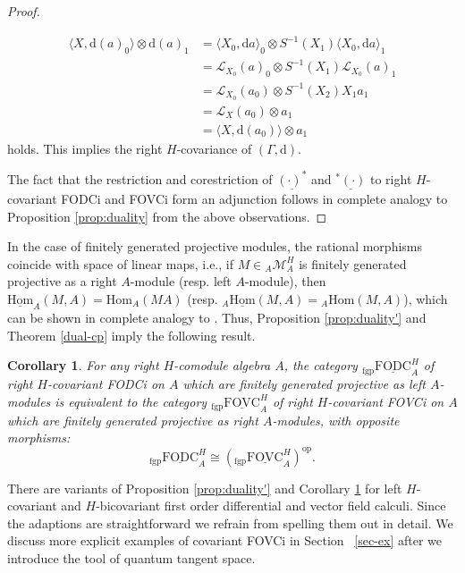 \documentclass{article}
\newtheorem{corollary}[thm]{Corollary}
\theoremstyle{definition}
\newcommand{\fgp}{{\mathrm{fgp}}}
\begin{document}
\begin{proof}
\begin{enumerate}
			\begin{align*}
				\langle X,\mathrm{d}(a)_0\rangle\otimes\mathrm{d}(a)_1
				&=\langle X_0,\mathrm{d}a\rangle_0\otimes S^{-1}(X_1)\langle X_0,\mathrm{d}a\rangle_1\\
				&=\mathscr{L}_{X_0}(a)_0\otimes S^{-1}(X_1)\mathscr{L}_{X_0}(a)_1\\
				&=\mathscr{L}_{X_0}(a_0)\otimes S^{-1}(X_2)X_1a_1\\
				&=\mathscr{L}_X(a_0)\otimes a_1\\
				&=\langle X,\mathrm{d}(a_0)\rangle\otimes a_1
			\end{align*}
			holds. This implies the right $H$-covariance of $(\Gamma,\mathrm{d})$.
		\end{enumerate}
		The fact that the restriction and corestriction of $\underline{(\cdot)^*}$ and $\underline{{}^*(\cdot)}$ to right $H$-covariant FODCi and FOVCi form an adjunction follows in complete analogy to Proposition \ref{prop:duality} from the above observations. 
	\end{proof}
	In the case of finitely generated projective modules, the rational morphisms coincide with space of linear maps, i.e., if $M\in{}_A\mathcal{M}_A^H$ is finitely generated projective as a right $A$-module (resp. left $A$-module), then $\underline{\mathrm{Hom}}_A(M,A)=\mathrm{Hom}_A(MA)$ (resp. ${}_A\underline{\mathrm{Hom}}(M,A)={}_A\mathrm{Hom}(M,A)$), which can be shown in complete analogy to \cite[Proposition 2.11]{PaoloThomas}. Thus, Proposition \ref{prop:duality'} and Theorem \ref{dual-cp} imply the following result.
	\begin{corollary}\label{cor:covFGPequ}
		For any right $H$-comodule algebra $A$, the category ${}_{\fgp}\underline{\mathrm{FODC}}^H_A$ of right $H$-covariant FODCi on $A$ which are finitely generated projective as 
		left $A$-modules is equivalent to the category ${}_{\fgp}\underline{\mathrm{FOVC}}^H_A$ of right $H$-covariant FOVCi on $A$ which are finitely generated projective as 
		right $A$-modules, with opposite morphisms:
		$$
		{}_{\fgp}\underline{\mathrm{FODC}}^H_A\cong({}_{\fgp}\underline{\mathrm{FOVC}}^H_A)^\mathrm{op}.
		$$
	\end{corollary}
	There are variants of Proposition \ref{prop:duality'} and Corollary \ref{cor:covFGPequ} for left $H$-covariant and $H$-bicovariant first order differential and vector field calculi. Since the adaptions are straightforward we refrain from spelling them out in detail. We discuss more explicit examples of covariant FOVCi in Section~
	\ref{sec-ex} after we introduce the tool of quantum tangent space.
	
\end{document}
